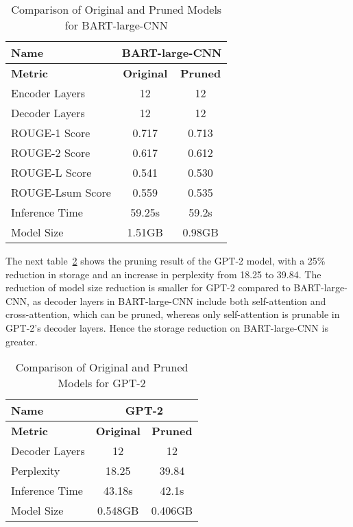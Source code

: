 \begin{table}[h!]
    \centering
    \begin{tabular}{lcc}
        \toprule
        \textbf{Name}         & \multicolumn{2}{c}{\textbf{BART-large-CNN}} \\ \midrule
        \textbf{Metric}       & \textbf{Original} & \textbf{Pruned} \\ \midrule
        Encoder Layers        & 12                     & 12                     \\
        Decoder Layers        & 12                     & 12                     \\
        ROUGE-1 Score         & 0.717                  & 0.713                  \\
        ROUGE-2 Score         & 0.617                  & 0.612                  \\
        ROUGE-L Score         & 0.541                  & 0.530                  \\
        ROUGE-Lsum Score      & 0.559                  & 0.535                  \\
        Inference Time        & 59.25s                 & 59.2s                  \\
        Model Size            & 1.51GB                 & 0.98GB                 \\ \bottomrule
    \end{tabular}
    \caption{Comparison of Original and Pruned Models for BART-large-CNN}
    \label{tab:BART_comparison_pruning}
\end{table}

The next table~\ref{tab:gpt2_comparison_pruning} shows the pruning result of the GPT-2 model, with a 25\% reduction in storage and an increase in perplexity from 18.25 to 39.84. The reduction of model size reduction is smaller for GPT-2 compared to BART-large-CNN, as decoder layers in BART-large-CNN include both self-attention and cross-attention, which can be pruned, whereas only self-attention is prunable in GPT-2's decoder layers. Hence the storage reduction on BART-large-CNN is greater.

\begin{table}[h!]
    \centering
    \begin{tabular}{lcc}
        \toprule
        \textbf{Name}         & \multicolumn{2}{c}{\textbf{GPT-2}} \\ \midrule
        \textbf{Metric}       & \textbf{Original} & \textbf{Pruned} \\ \midrule
        Decoder Layers        & 12                     & 12                     \\
        Perplexity            & 18.25                  & 39.84                  \\
        Inference Time        & 43.18s                 & 42.1s                  \\
        Model Size            & 0.548GB                & 0.406GB                \\ \bottomrule
    \end{tabular}
    \caption{Comparison of Original and Pruned Models for GPT-2}
    \label{tab:gpt2_comparison_pruning}
\end{table}

